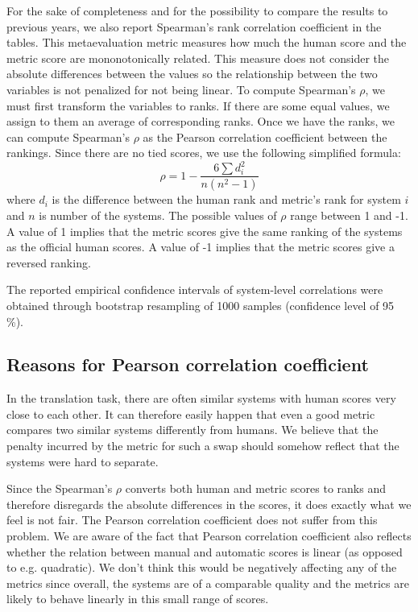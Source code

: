For the sake of completeness and for the possibility to compare the results to
previous years, we also report Spearman's rank correlation coefficient in the
tables. This metaevaluation metric measures how much the human score and the
metric score are mononotonically related.  This measure does not consider the
absolute differences between the values so the relationship between the two
variables is not penalized for not being linear.  To compute Spearman's $\rho$,
we must first transform the variables to ranks.  If there are some equal
values, we assign to them an average of corresponding ranks. Once we have the
ranks, we can compute Spearman's $\rho$ as the Pearson correlation coefficient
between the rankings. Since there are no tied scores, we use the following
simplified formula: \begin{equation*} \rho = 1 - \frac{6 \sum{d_i^2}}{n(n^2
-1)} \end{equation*} where $d_i$ is the difference between the human rank and
metric's rank for system $i$ and $n$ is number of the systems. The possible
values of $\rho$ range between 1 and -1. A value of 1 implies that the metric
scores give the same ranking of the systems as the official human scores. A
value of -1 implies that the metric scores give a reversed ranking.

The reported empirical confidence intervals of system-level correlations were
obtained through bootstrap resampling of 1000 samples (confidence level of
95\,\%).

\subsection{Reasons for Pearson correlation coefficient}

In the translation task, there are often similar systems with human scores very
close to each other. It can therefore easily happen that even a good metric
compares two similar systems differently from humans. We believe that the
penalty incurred by the metric for such a swap should somehow reflect that the
systems were hard to separate.

Since the Spearman's $\rho$ converts both human and metric scores to ranks and
therefore disregards the absolute differences in the scores, it does exactly what
we feel is not fair. The Pearson correlation coefficient does not suffer from this 
problem. We are aware of the fact that Pearson correlation coefficient also
reflects whether the relation between manual and automatic scores is linear (as
opposed to e.g. quadratic). We don't think this would be negatively affecting
any of the metrics since overall, the systems are of a comparable quality and
the metrics are likely to behave linearly in this small
range of scores.


